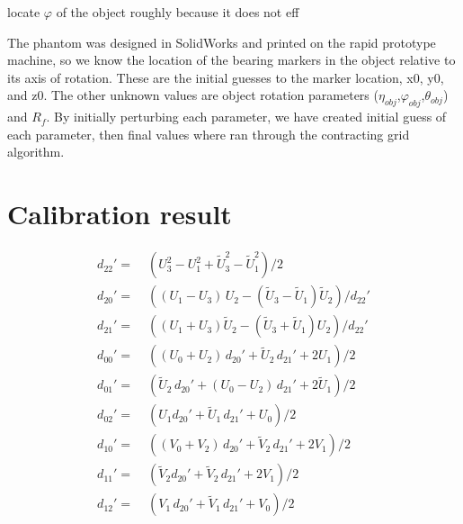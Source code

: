 locate $\varphi$ of the object roughly because it does not eff

The phantom was designed in SolidWorks and printed on the rapid prototype machine, so we know the location of the bearing markers in the object relative to its axis of rotation.  These are the initial guesses to the marker location, x0, y0, and z0.  The other unknown values are object rotation parameters ($\eta_{obj}$,$\varphi_{obj}$,$\theta_{obj}$) and $R_f$.  By initially perturbing each parameter, we have created initial guess of each parameter, then final values where ran through the contracting grid algorithm.

\section{Calibration result}


\begin{equation}\label{eq:d_coeff}
\begin{split}
d_{22}' =& \; (U_3^2 - U_1^2 + \tilde{U}_3^2 - \tilde{U}_1^2)/2 \\
d_{20}' =& \; ((U_1 - U_3)\,U_2 - (\tilde{U}_3 - \tilde{U}_1)\tilde{U}_2)/d_{22}' \\
d_{21}' =& \; ((U_1 + U_3)\tilde{U}_2 - (\tilde{U}_3 + \tilde{U}_1) U_2)/ d_{22}' \\
d_{00}' =& \; ((U_0 + U_2)\,d_{20}' + \tilde{U}_2 \, d_{21}' + 2 U_1)/2 \\
d_{01}' =& \; (\tilde{U}_2 \, d_{20}' + (U_0 - U_2)\, d_{21}' + 2 \tilde{U}_1)/2  \\
d_{02}' =& \; (U_1 d_{20}' + \tilde{U}_1 \, d_{21}' + U_0)/2 \\
d_{10}' =& \; ( (V_0 + V_2) \, d_{20}' + \tilde{V}_2 \, d_{21}' + 2 V_1 )/2 \\
d_{11}' =& \; (\tilde{V}_2 d_{20}' + \tilde{V}_2 \, d_{21}' + 2 V_1)/2 \\
d_{12}' =& \; (V_1 \, d_{20}' + \tilde{V}_1 \, d_{21}' + V_0)/2   \\
\end{split}
\end{equation}

